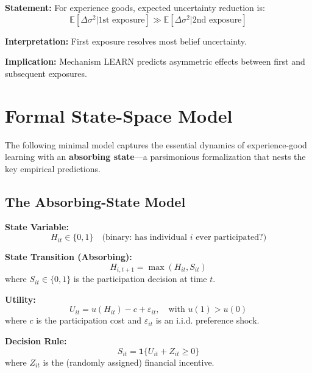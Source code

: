 \begin{tcolorbox}[colback=gray!5!white, colframe=gray!75!black,
    title=Axiom HF-4: Belief Asymmetry]
\textbf{Statement:} For experience goods, expected uncertainty reduction is:
\begin{equation}
\mathbb{E}[\Delta \sigma^2 | \text{1st exposure}] \gg \mathbb{E}[\Delta \sigma^2 | \text{2nd exposure}]
\end{equation}

\textbf{Interpretation:} First exposure resolves most belief uncertainty.

\textbf{Implication:} Mechanism LEARN predicts asymmetric effects between first and subsequent exposures.
\end{tcolorbox}


\section{Formal State-Space Model}
\label{sec:hf-statespace}

The following minimal model captures the essential dynamics of experience-good learning
with an \textbf{absorbing state}---a parsimonious formalization that nests the key empirical
predictions.

\subsection{The Absorbing-State Model}

\begin{tcolorbox}[colback=orange!5!white, colframe=orange!75!black,
    title=Definition: Minimal State-Space Model for Experience-Good Learning]

\textbf{State Variable:}
\begin{equation}
H_{it} \in \{0, 1\} \quad \text{(binary: has individual } i \text{ ever participated?)}
\end{equation}

\textbf{State Transition (Absorbing):}
\begin{equation}
H_{i,t+1} = \max(H_{it}, S_{it})
\end{equation}
where $S_{it} \in \{0,1\}$ is the participation decision at time $t$.

\textbf{Utility:}
\begin{equation}
U_{it} = u(H_{it}) - c + \varepsilon_{it}, \quad \text{with } u(1) > u(0)
\end{equation}
where $c$ is the participation cost and $\varepsilon_{it}$ is an i.i.d. preference shock.

\textbf{Decision Rule:}
\begin{equation}
S_{it} = \mathbf{1}\{U_{it} + Z_{it} \geq 0\}
\end{equation}
where $Z_{it}$ is the (randomly assigned) financial incentive.

\end{tcolorbox}

